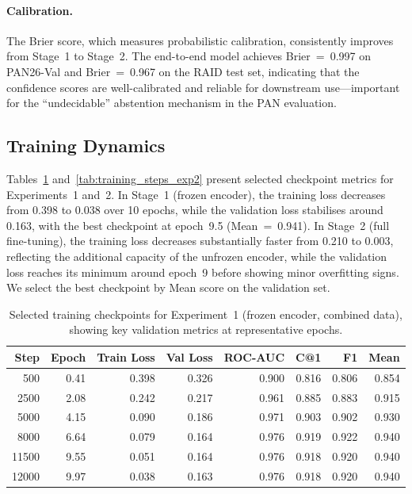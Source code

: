 \paragraph{Calibration.}
The Brier score, which measures probabilistic calibration, consistently improves from
Stage~1 to Stage~2. The end-to-end model achieves Brier~=~0.997 on PAN26-Val and
Brier~=~0.967 on the RAID test set, indicating that the confidence scores are
well-calibrated and reliable for downstream use—important for the ``undecidable''
abstention mechanism in the PAN evaluation.

\subsection{Training Dynamics}

Tables~\ref{tab:training_steps_exp1} and~\ref{tab:training_steps_exp2} present selected
checkpoint metrics for Experiments~1 and~2. In Stage~1
(frozen encoder), the training loss decreases from 0.398 to 0.038 over 10 epochs,
while the validation loss stabilises around 0.163, with the best checkpoint at epoch~9.5
(Mean~=~0.941). In Stage~2 (full fine-tuning), the training loss decreases substantially
faster from 0.210 to 0.003, reflecting the additional capacity of the unfrozen encoder,
while the validation loss reaches its minimum around epoch~9 before showing minor
overfitting signs. We select the best checkpoint by Mean score on the validation set.

\begin{table}[t]
\caption{Selected training checkpoints for Experiment~1 (frozen encoder, combined data),
showing key validation metrics at representative epochs.}
\label{tab:training_steps_exp1}
\begin{tabular}{rrrrrrrr}
\toprule
\textbf{Step} & \textbf{Epoch} & \textbf{Train Loss} & \textbf{Val Loss} & \textbf{ROC-AUC} & \textbf{C@1} & \textbf{F1} & \textbf{Mean} \\
\midrule
500   & 0.41 & 0.398 & 0.326 & 0.900 & 0.816 & 0.806 & 0.854 \\
2500  & 2.08 & 0.242 & 0.217 & 0.961 & 0.885 & 0.883 & 0.915 \\
5000  & 4.15 & 0.090 & 0.186 & 0.971 & 0.903 & 0.902 & 0.930 \\
8000  & 6.64 & 0.079 & 0.164 & 0.976 & 0.919 & 0.922 & 0.940 \\
11500 & 9.55 & 0.051 & 0.164 & 0.976 & 0.918 & 0.920 & 0.940 \\
12000 & 9.97 & 0.038 & 0.163 & 0.976 & 0.918 & 0.920 & 0.940 \\
\bottomrule
\end{tabular}
\end{table}


